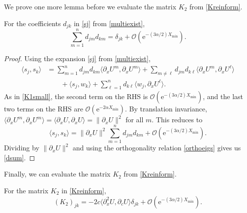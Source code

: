 \documentclass[review,onefignum,onetabnum]{siamart171218}
\newcommand{\rme}{\mathrm{e}}
\newcommand{\vK}{\bm{\mathit{K}}}
\begin{document}
We prove one more lemma before we evaluate the matrix $\vK_2$ from \cref{Kreinform}.


\begin{lemma}\label{orthogonald}
For the coefficients $d_{jk}$ in \cref{sj} from \cref{multiexist},
\begin{equation}\label{dsum}
\sum_{m = 1}^{n} d_{jm} d_{km} = \delta_{jk} + \mathcal{O}(\rme^{-(3 \alpha/2) X_{\mathrm{min}}}).
\end{equation}
\end{lemma}

\begin{proof}
Using the expansion \cref{sj} from \cref{multiexist},
\[
\begin{aligned}
\langle s_j, s_k \rangle
&= \sum_{m = 1}^{n} d_{jm} d_{km} \langle \partial_xU^m,\partial_xU^m \rangle
+ \sum_{m \neq \ell} d_{jm} d_{k\ell} \langle \partial_xU^m, \partial_xU^\ell \rangle\\
&\qquad
+ \langle s_j, w_k \rangle
+ \sum_{\ell = 1}^{n} d_{k\ell} \langle w_j, \partial_xU^\ell \rangle.
\end{aligned}
\]
As in \cref{K1small}, the second term on the RHS is $\mathcal{O}(\rme^{-(3 \alpha/2) X_{\mathrm{min}}})$, and the last two terms on the RHS are $\mathcal{O}(\rme^{-2 \alpha X_{\mathrm{min}}})$. By translation invariance, $\langle \partial_xU^m, \partial_xU^m \rangle = \langle \partial_xU, \partial_xU \rangle = \|\partial_xU\|^2$ for all $m$. This reduces to
\[
\langle s_j, s_k \rangle
= \|\partial_xU\|^2 \sum_{m = 1}^{n} d_{jm} d_{km} + \mathcal{O}(\rme^{-(3 \alpha/2) X_{\mathrm{min}}}).
\]
Dividing by $\|\partial_xU\|^2$ and using the orthogonality relation \cref{orthoeigs} gives us \cref{dsum}.
\end{proof}

Finally, we can evaluate the matrix $\vK_2$ from \cref{Kreinform}.


\begin{lemma}\label{K2diag}
For the matrix $\vK_2$ in \cref{Kreinform},
\begin{equation}\label{K2final}
(\vK_2)_{jk}
= -2 c\langle\partial_x^2 U, \partial_c U \rangle \delta_{jk} + \mathcal{O}(\rme^{-(3 \alpha/2) X_{\mathrm{min}}}).
\end{equation}
\end{lemma}
\end{document}
